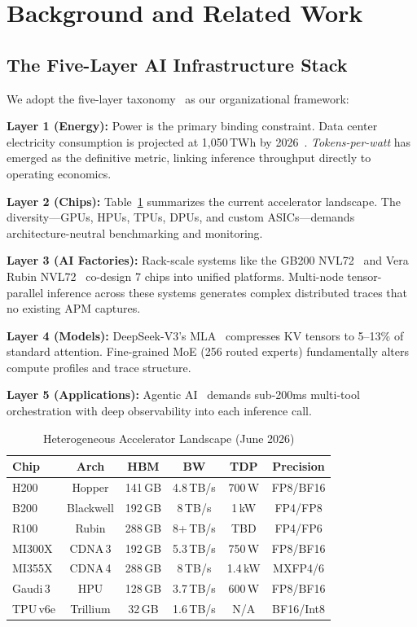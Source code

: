 \documentclass[conference,10pt]{IEEEtran}
\begin{document}
\section{Background and Related Work}
\label{sec:bg}

\subsection{The Five-Layer AI Infrastructure Stack}
We adopt the five-layer taxonomy~\cite{nvidia2025blackwell} as our organizational framework:

\textbf{Layer 1 (Energy):} Power is the primary binding constraint. Data center electricity consumption is projected at 1,050\,TWh by 2026~\cite{iea2025datacenter}. \emph{Tokens-per-watt} has emerged as the definitive metric, linking inference throughput directly to operating economics.

\textbf{Layer 2 (Chips):} Table~\ref{tab:accel} summarizes the current accelerator landscape. The diversity---GPUs, HPUs, TPUs, DPUs, and custom ASICs---demands architecture-neutral benchmarking and monitoring.

\textbf{Layer 3 (AI Factories):} Rack-scale systems like the GB200 NVL72~\cite{nvidia2025blackwell} and Vera Rubin NVL72~\cite{nvidia2026verarubin} co-design 7 chips into unified platforms. Multi-node tensor-parallel inference across these systems generates complex distributed traces that no existing APM captures.

\textbf{Layer 4 (Models):} DeepSeek-V3's MLA~\cite{liu2024deepseekv3} compresses KV tensors to 5--13\% of standard attention. Fine-grained MoE (256 routed experts) fundamentally alters compute profiles and trace structure.

\textbf{Layer 5 (Applications):} Agentic AI~\cite{wang2024survey_agents} demands sub-200ms multi-tool orchestration with deep observability into each inference call.

\begin{table}[!htbp]
\caption{Heterogeneous Accelerator Landscape (June 2026)}
\label{tab:accel}
\centering\footnotesize
\begin{tabular}{@{}lccccc@{}}
\toprule
\textbf{Chip} & \textbf{Arch} & \textbf{HBM} & \textbf{BW} & \textbf{TDP} & \textbf{Precision} \\
\midrule
H200 & Hopper & 141\,GB & 4.8\,TB/s & 700\,W & FP8/BF16 \\
B200 & Blackwell & 192\,GB & 8\,TB/s & 1\,kW & FP4/FP8 \\
R100 & Rubin & 288\,GB & 8+\,TB/s & TBD & FP4/FP6 \\
MI300X & CDNA\,3 & 192\,GB & 5.3\,TB/s & 750\,W & FP8/BF16 \\
MI355X & CDNA\,4 & 288\,GB & 8\,TB/s & 1.4\,kW & MXFP4/6 \\
Gaudi\,3 & HPU & 128\,GB & 3.7\,TB/s & 600\,W & FP8/BF16 \\
TPU\,v6e & Trillium & 32\,GB & 1.6\,TB/s & N/A & BF16/Int8 \\
\bottomrule
\end{tabular}
\end{table}
\end{document}
